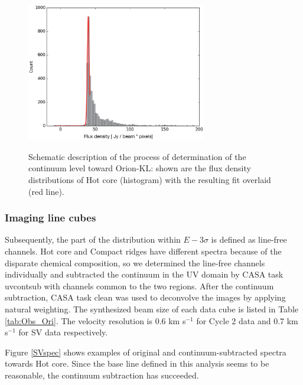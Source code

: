 \begin{figure}[hbp] 
\centering
\vspace{-0.5cm}
\includegraphics[width=0.7\textwidth]{OrionKL/ex_histogram_fit.eps}
\label{fig:histo}
\vspace{-1.5cm}
\caption{Schematic description of the process of determination of the continuum level toward Orion-KL: 
shown are the flux density distributions of Hot core (histogram) with the resulting fit overlaid (red line).}
\end{figure}

\newpage

\subsubsection*{Imaging line cubes}
Subsequently, the part of the distribution within $E - 3\sigma$ is defined as line-free channels.
Hot core and Compact ridges have different spectra because of the disparate chemical composition, 
so we determined the line-free channels individually and subtracted the continuum
in the UV domain by CASA task {\sc uvcontsub} with channels common to the two regions.
After the continuum subtraction, CASA task {\sc clean} was used to deconvolve the images by applying natural weighting.
The synthesized beam size of each data cube is listed in Table \ref{tab:Obs_Ori}. 
The velocity resolution is 0.6 km s$^{-1}$ for Cycle 2 data and 0.7 km s$^{-1}$ for SV data respectively.

Figure \ref{SVspec} shows examples of original and continuum-subtracted spectra towards Hot core. 
Since the base line defined in this analysis seems to be reasonable, the continuum subtraction has succeeded.

